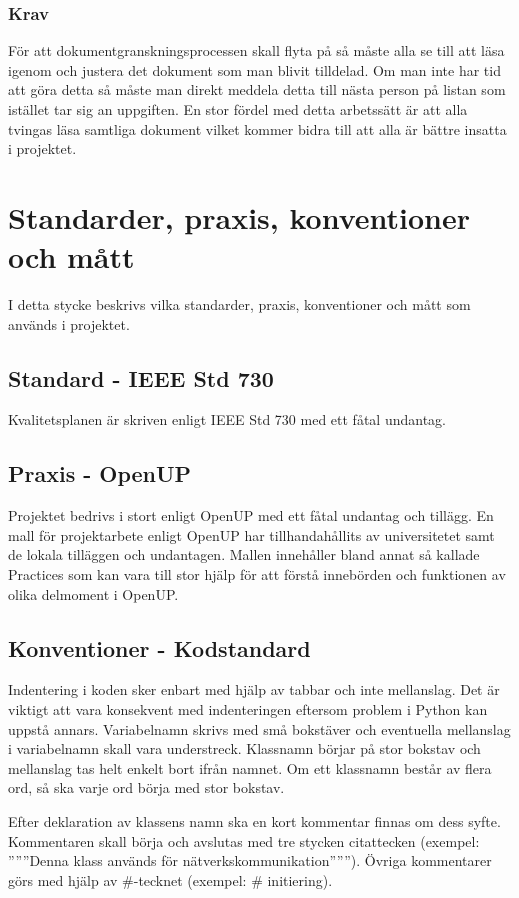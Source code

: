 \subsubsection{Krav}
För att dokumentgranskningsprocessen skall flyta på så måste alla se till att läsa igenom och justera det dokument som man blivit tilldelad. Om man inte har tid att göra detta så måste man direkt meddela detta till nästa person på listan som istället tar sig an uppgiften. En stor fördel med detta arbetssätt är att alla tvingas läsa samtliga dokument vilket kommer bidra till att alla är bättre insatta i projektet.

\section{Standarder, praxis, konventioner och mått}
I detta stycke beskrivs vilka standarder, praxis, konventioner och mått som används i projektet.

\subsection{Standard - IEEE Std 730}
Kvalitetsplanen är skriven enligt IEEE Std 730 med ett fåtal undantag.

\subsection{Praxis - OpenUP}
Projektet bedrivs i stort enligt OpenUP med ett fåtal undantag och tillägg. En mall för projektarbete enligt OpenUP har tillhandahållits av universitetet samt de lokala tilläggen och undantagen. Mallen innehåller bland annat så kallade Practices som kan vara till stor hjälp för att förstå innebörden och funktionen av olika delmoment i OpenUP.

\subsection{Konventioner - Kodstandard}
Indentering i koden sker enbart med hjälp av tabbar och inte mellanslag. Det är viktigt att vara konsekvent med indenteringen eftersom problem i Python kan uppstå annars. Variabelnamn skrivs med små bokstäver och eventuella mellanslag i variabelnamn skall vara understreck. Klassnamn börjar på stor bokstav och mellanslag tas helt enkelt bort ifrån namnet. Om ett klassnamn består av flera ord, så ska varje ord börja med stor bokstav.

Efter deklaration av klassens namn ska en kort kommentar finnas om dess syfte. Kommentaren skall börja och avslutas med tre stycken citattecken (exempel: ''''''Denna klass används för nätverkskommunikation''''''). Övriga kommentarer görs med hjälp av \#-tecknet (exempel: \# initiering).

